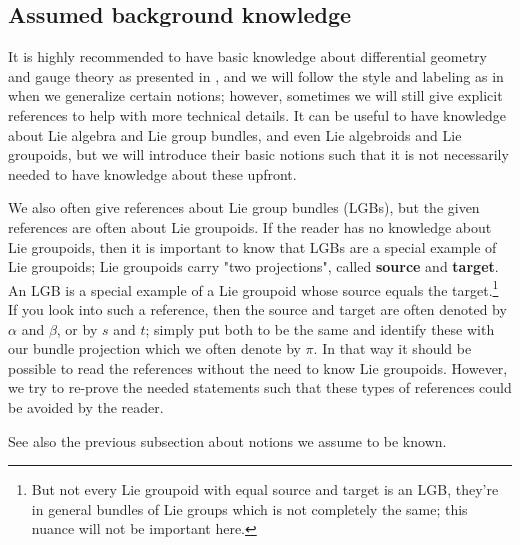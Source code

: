 \documentclass[a4paper,oneside,11pt,bibliography=totoc]{scrartcl}
\theoremstyle{plain}
\theoremstyle{remark}
\theoremstyle{definition}
\begin{document}
\subsection{Assumed background knowledge}

It is highly recommended to have basic knowledge about differential geometry and gauge theory as presented in \cite[especially Chapter 1 to 5]{Hamilton}, and we will follow the style and labeling as in \cite{Hamilton} when we generalize certain notions; however, sometimes we will still give explicit references to help with more technical details. It can be useful to have knowledge about Lie algebra and Lie group bundles, and even Lie algebroids and Lie groupoids, but we will introduce their basic notions such that it is not necessarily needed to have knowledge about these upfront.

We also often give references about Lie group bundles (LGBs), but the given references are often about Lie groupoids. If the reader has no knowledge about Lie groupoids, then it is important to know that LGBs are a special example of Lie groupoids; Lie groupoids carry "two projections", called \textbf{source} and \textbf{target}. An LGB is a special example of a Lie groupoid whose source equals the target.\footnote{But not every Lie groupoid with equal source and target is an LGB, they're in general bundles of Lie groups which is not completely the same; this nuance will not be important here.} If you look into such a reference, then the source and target are often denoted by $\alpha$ and $\beta$, or by $s$ and $t$; simply put both to be the same and identify these with our bundle projection which we often denote by $\pi$. In that way it should be possible to read the references without the need to know Lie groupoids. However, we try to re-prove the needed statements such that these types of references could be avoided by the reader.

See also the previous subsection about notions we assume to be known.
\end{document}
